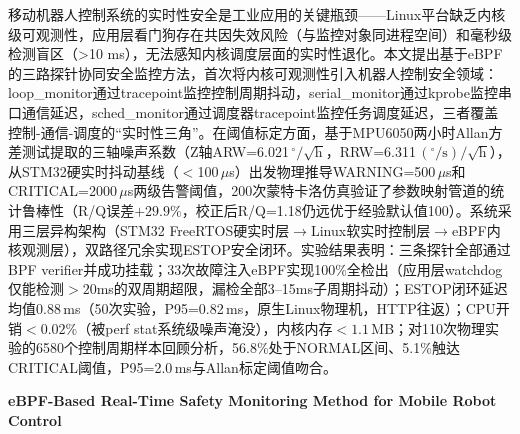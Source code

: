 \documentclass{rjthesis}
\begin{document}
\rjmaketitle

\begin{rjabstract}
移动机器人控制系统的实时性安全是工业应用的关键瓶颈——Linux平台缺乏内核级可观测性，应用层看门狗存在共因失效风险（与监控对象同进程空间）和毫秒级检测盲区（>10 ms），无法感知内核调度层面的实时性退化。本文提出基于eBPF的三路探针协同安全监控方法，首次将内核可观测性引入机器人控制安全领域：loop\_monitor通过tracepoint监控控制周期抖动，serial\_monitor通过kprobe监控串口通信延迟，sched\_monitor通过调度器tracepoint监控任务调度延迟，三者覆盖控制-通信-调度的``实时性三角''。在阈值标定方面，基于MPU6050两小时Allan方差测试提取的三轴噪声系数（Z轴ARW=6.021\,$^{\circ}/\sqrt{\mathrm{h}}$，RRW=6.311\,$(^{\circ}/\mathrm{s})/\sqrt{\mathrm{h}}$），从STM32硬实时抖动基线（$<$100\,$\mu$s）出发物理推导WARNING=500\,$\mu$s和CRITICAL=2000\,$\mu$s两级告警阈值，200次蒙特卡洛仿真验证了参数映射管道的统计鲁棒性（R/Q误差$+29.9\%$，校正后R/Q=1.18仍远优于经验默认值100）。系统采用三层异构架构（STM32 FreeRTOS硬实时层$\to$Linux软实时控制层$\to$eBPF内核观测层），双路径冗余实现ESTOP安全闭环。实验结果表明：三条探针全部通过BPF verifier并成功挂载；33次故障注入eBPF实现100\%全检出（应用层watchdog仅能检测$>20$ms的双周期超限，漏检全部3--15ms子周期抖动）；ESTOP闭环延迟均值0.88\,ms（50次实验，P95=0.82\,ms，原生Linux物理机，HTTP往返）；CPU开销$<0.02\%$（被perf stat系统级噪声淹没），内核内存$<1.1$\,MB；对110次物理实验的6580个控制周期样本回顾分析，56.8\%处于NORMAL区间、5.1\%触达CRITICAL阈值，P95=2.0\,ms与Allan标定阈值吻合。
\end{rjabstract}

\vspace{1em}

{\centering\xiaosihao\textbf{eBPF-Based Real-Time Safety Monitoring Method for Mobile Robot Control}\par}

\vspace{0.5em}
\end{document}
